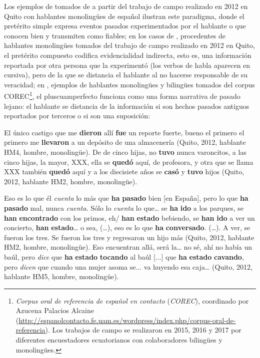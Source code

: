 \documentclass[output=paper]{../langscibook}
\begin{document}
Los ejemplos de  tomados de  \citet{PfänderPalaciosAlcaine2013} a partir del trabajo de campo realizado en 2012 en Quito con hablantes monolingües de español ilustran este paradigma, donde el pretérito simple expresa eventos pasados experimentados por el hablante o que conocen bien y transmiten como fiables; en los casos de , procedentes de hablantes monolingües tomados del trabajo de campo realizado en 2012 en Quito, el pretérito compuesto codifica evidencialidad indirecta, esto es, una información reportada por otra persona que la experimentó (los verbos de habla aparecen en cursiva), pero de la que se distancia el hablante al no hacerse responsable de su veracidad; en , ejemplos de hablantes monolingües y bilingües tomados del corpus COREC\footnote{\textit{Corpus oral de referencia de español en contacto} (\textit{COREC}), coordinado por Azucena Palacios Alcaine (\url{http://espanolcontacto.fe.uam.es/wordpress/index.php/corpus-oral-de-referencia}). Los trabajos de campo se realizaron en 2015, 2016 y 2017 por diferentes encuestadores ecuatorianos con colaboradores bilingües y monolingües.}, el pluscuamperfecto funciona como una forma narrativa de pasado lejano: el hablante se distancia de la información si son hechos pasados antiguos reportados por terceros o si son una suposición:

\largerpage
\ea\label{ex:palacios:3}
\ea El único castigo que me \textbf{dieron} allí \textbf{fue} un reporte fuerte, bueno el primero el primero me \textbf{llevaron} a un depósito de una almacenería (Quito, 2012, hablante HM4, hombre, monolingüe).
\newpage
\ex De de cinco hijas, no \textbf{tuvo} nunca varoncitos, a las cinco hijas, la mayor, XXX, ella se \textbf{quedó} aquí, de profesora, y otra que se llama XXX también \textbf{quedó} aquí y a los diecisiete años se \textbf{casó} y \textbf{tuvo} hijos (Quito, 2012, hablante HM2, hombre, monolingüe).
\z
\z

\ea\label{ex:palacios:4}
\ea Eso es lo que él \textit{cuenta} lo más que \textbf{ha} \textbf{pasado} bien [en España], pero lo que \textbf{ha} \textbf{pasado} mal, nunca \textit{cuenta}. Sólo lo \textit{cuenta} lo que… se \textbf{ha} \textbf{ido} a los parques, se \textbf{han} \textbf{encontrado} con los primos, eh/ \textbf{han} \textbf{estado} bebiendo, se \textbf{han} \textbf{ido} a ver un concierto, \textbf{han} \textbf{estado}… o sea, (…), eso es lo que \textbf{ha} \textbf{conversado}. (…). A ver, se fueron los tres. Se fueron los tres y regresaron un hijo más (Quito, 2012, hablante HM2, hombre, monolingüe).
\ex  Eso encuentran allá, será la… no sé, ahí no había un baúl, pero \textit{dice} que \textbf{ha} \textbf{estado} \textbf{tocando} al baúl [...] que \textbf{ha} \textbf{estado} \textbf{cavando}, pero \textit{dicen} que cuando una mujer asoma se... va huyendo esa caja… (Quito, 2012, hablante HM5, hombre, monolingüe).
\z
\z
\end{document}
